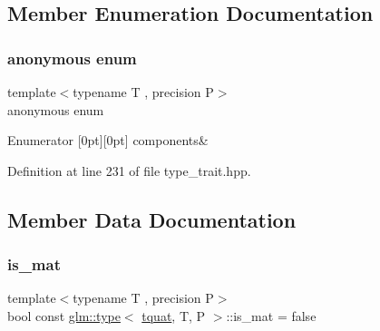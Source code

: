 \subsection{Member Enumeration Documentation}
\mbox{\label{structglm_1_1type_3_01tquat_00_01_t_00_01_p_01_4_ab8242348092640248840d8557de54e79}} 
\subsubsection{\texorpdfstring{anonymous enum}{anonymous enum}}
{\footnotesize\ttfamily template$<$typename T , precision P$>$ \\
anonymous enum}

\begin{DoxyEnumFields}{Enumerator}
[0pt][0pt]{}\mbox{\label{structglm_1_1type_3_01tquat_00_01_t_00_01_p_01_4_ab8242348092640248840d8557de54e79a8b712f310325ef2e285014863ac1164d}} 
components&\\
\hline

\end{DoxyEnumFields}


Definition at line 231 of file type\+\_\+trait.\+hpp.



\subsection{Member Data Documentation}
\mbox{\label{structglm_1_1type_3_01tquat_00_01_t_00_01_p_01_4_a114d99ae019bf324d1b690b045ecbb36}} 
\subsubsection{\texorpdfstring{is\_mat}{is\_mat}}
{\footnotesize\ttfamily template$<$typename T , precision P$>$ \\
bool const \mbox{\hyperlink{structglm_1_1type}{glm\+::type}}$<$ \mbox{\hyperlink{structglm_1_1tquat}{tquat}}, T, P $>$\+::is\+\_\+mat = false\hspace{0.3cm}{\ttfamily [static]}}



